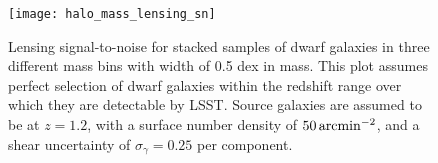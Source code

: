
\begin{figure}
\centering
\texttt{[image: halo\_mass\_lensing\_sn]}
\caption{
\label{fig:dwarf_sn} Lensing signal-to-noise for stacked samples of dwarf galaxies in three different mass bins with width of 0.5 dex in mass. 
This plot assumes perfect selection of dwarf galaxies within the redshift range over which they are detectable by LSST. 
Source galaxies are assumed to be at $z=1.2$, with a surface number density of $50 \mathrm{\,arcmin}^{-2}$, and a shear uncertainty of $\sigma_\gamma = 0.25$ per component.}
\end{figure}



